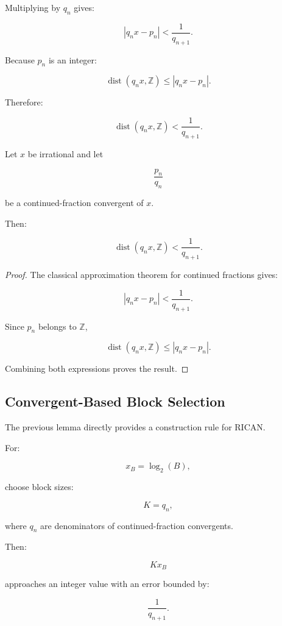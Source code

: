 \documentclass[onecolumn]{IEEEtran}
\begin{document}
Multiplying by $q_n$ gives:

\[
|q_nx-p_n|
<
\frac{1}{q_{n+1}} .
\]

Because $p_n$ is an integer:

\[
\operatorname{dist}(q_nx,\mathbb{Z})
\leq
|q_nx-p_n|.
\]

Therefore:

\[
\operatorname{dist}(q_nx,\mathbb{Z})
<
\frac{1}{q_{n+1}} .
\]

\begin{lemma}
\label{lem:convergent}

Let $x$ be irrational and let

\[
\frac{p_n}{q_n}
\]

be a continued-fraction convergent of $x$.

Then:

\[
\operatorname{dist}(q_nx,\mathbb{Z})
<
\frac{1}{q_{n+1}} .
\]

\end{lemma}

\begin{proof}

The classical approximation theorem for continued fractions gives:

\[
|q_nx-p_n|
<
\frac{1}{q_{n+1}} .
\]

Since $p_n$ belongs to $\mathbb{Z}$,

\[
\operatorname{dist}(q_nx,\mathbb{Z})
\leq
|q_nx-p_n|.
\]

Combining both expressions proves the result.

\end{proof}

\subsection{Convergent-Based Block Selection}

The previous lemma directly provides a construction rule for RICAN.

For:

\[
x_B=\log_2(B),
\]

choose block sizes:

\[
K=q_n,
\]

where $q_n$ are denominators of continued-fraction convergents.

Then:

\[
Kx_B
\]

approaches an integer value with an error bounded by:

\[
\frac{1}{q_{n+1}} .
\]
\end{document}
